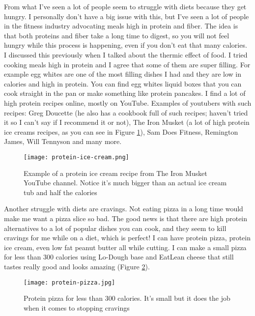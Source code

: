 \documentclass[openany, 12pt]{book}
\begin{document}
        From what I've seen a lot of people seem to struggle with diets because they get hungry. I personally don't have a big issue with this, but I've seen a lot of people in 
        the fitness industry advocating meals high in protein and fiber. The idea is that both proteins and fiber take a long time to digest, so you will not feel hungry while
        this process is happening, even if you don't eat that many calories. I discussed this previously when I talked about the thermic effect of food.
        I tried cooking meals high in protein and I agree that some of them are super filling. For example egg whites are
        one of the most filling dishes I had and they are low in calories and high in protein. You can find egg whites liquid boxes that you can cook straight in
        the pan or make something like protein pancakes. 
        I find a lot of high protein recipes online, mostly on YouTube. Examples of youtubers with such recipes: Greg Doucette
        (he also has a cookbook full of such recipes; haven't tried it so I can't say if I recommend it or not), The Iron Musket
        (a lot of high protein ice creams recipes, as you can see in Figure \ref{fig6}), Sam Does Fitness, Remington James, Will Tennyson and many more.

	\begin{figure}[h]
		\centering
		\texttt{[image: protein-ice-cream.png]}
		\caption{Example of a protein ice cream recipe from The Iron Musket YouTube channel. Notice it's much bigger than an actual ice cream tub and half the calories}
		\label{fig6}
	\end{figure}

        Another struggle with diets are cravings. Not eating pizza in a long time would make me want a pizza slice so bad. The good news is that there are high protein
        alternatives to a lot of popular dishes you can cook, and they seem to kill cravings for me while on a diet, which is perfect! I can have protein pizza, protein
        ice cream, even low fat peanut butter all while cutting. I can make a small pizza for less than 300 calories using Lo-Dough base and EatLean cheese that still tastes really
        good and looks amazing (Figure \ref{fig7}).
        
	\begin{figure}[h]
		\centering
		\texttt{[image: protein-pizza.jpg]}
		\caption{Protein pizza for less than 300 calories. It's small but it does the job when it comes to stopping cravings}
		\label{fig7}
	\end{figure}
\end{document}
